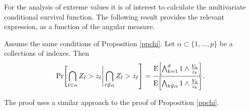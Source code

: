 For the analysis of extreme values it is of interest to calculate the multivariate conditional survival function. The following result provides the relevant expression, as a function of the angular measure.
\begin{prop}
Assume the same conditions of Proposition \ref{ppchi}. 
Let $\alpha \subset \{1, \ldots ,p\}$ be a collections of indexes. 
Then     
\begin{equation} \label{eqn:condsurv}
    \mathrm{Pr}\left[\bigcap_{\ell \in \alpha} Z_\ell > z_\ell \right|\left. \bigcap_{\ell\not\in\alpha} Z_\ell > z_\ell\right] =
      \frac{\expect{\bigwedge_{k = 1}^d 1\wedge \frac{V_k}{z_k}}}{\expect{\bigwedge_{k \not\in\alpha}1\wedge\frac{V_k}{z_k}}}.
  \end{equation}
\end{prop}  
The proof uses a similar approach to the proof of Proposition \ref{ppchi}.

